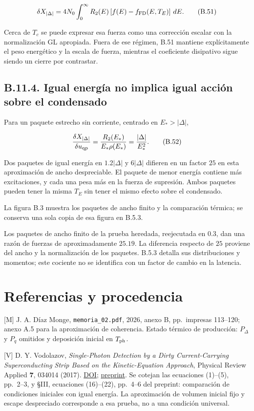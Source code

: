 \documentclass[
  spanish,
  10pt,
  a4paper,
]{article}
\begin{document}
\[
\delta X_{|\Delta|}
=4N_0\int_0^\infty R_2(E)
\left[f(E)-f_{\rm FD}(E,T_E)\right]\,dE.
\tag{B.51}
\]

Cerca de \(T_c\) se puede expresar esa fuerza como una corrección
escalar con la normalización GL apropiada. Fuera de ese régimen, B.51
mantiene explícitamente el peso energético y la escala de fuerza,
mientras el coeficiente disipativo sigue siendo un cierre por
contrastar.

\subsection{B.11.4. Igual energía no implica igual acción sobre el
condensado}\label{b.11.4.-igual-energuxeda-no-implica-igual-acciuxf3n-sobre-el-condensado}

Para un paquete estrecho sin corriente, centrado en \(E_*>|\Delta|\),

\[
\frac{\delta X_{|\Delta|}}{\delta u_{\rm qp}}
=\frac{R_2(E_*)}{E_*\rho(E_*)}
=\frac{|\Delta|}{E_*^2}.
\tag{B.52}
\]

Dos paquetes de igual energía en \(1.2|\Delta|\) y \(6|\Delta|\)
difieren en un factor \(25\) en esta aproximación de ancho despreciable.
El paquete de menor energía contiene más excitaciones, y cada una pesa
más en la fuerza de supresión. Ambos paquetes pueden tener la misma
\(T_E\) sin tener el mismo efecto sobre el condensado.

La figura B.3 muestra los paquetes de ancho finito y la comparación
térmica; se conserva una sola copia de esa figura en B.5.3.

Los paquetes de ancho finito de la prueba heredada, reejecutada en 0.3,
dan una razón de fuerzas de aproximadamente \(25.19\). La diferencia
respecto de \(25\) proviene del ancho y la normalización de los
paquetes. B.5.3 detalla sus distribuciones y momentos; este cociente no
se identifica con un factor de cambio en la latencia.

\section{Referencias y procedencia}\label{referencias-y-procedencia}

{[}M{]} J. A. Díaz Monge, \nolinkurl{memoria_02.pdf}, 2026, anexo B,
pp.~impresas 113--120; anexo A.5 para la aproximación de coherencia.
Estado térmico de producción: \(P_\Delta\) y \(P_q\) omitidos y
deposición inicial en \(T_{\rm ph}\).

{[}V{]} D. Y. Vodolazov, \emph{Single-Photon Detection by a Dirty
Current-Carrying Superconducting Strip Based on the Kinetic-Equation
Approach}, Physical Review Applied \textbf{7}, 034014 (2017).
\href{https://doi.org/10.1103/PhysRevApplied.7.034014}{DOI};
\href{https://arxiv.org/pdf/1611.06060}{preprint}. Se cotejan las
ecuaciones (1)--(5), pp.~2--3, y §III, ecuaciones (16)--(22), pp.~4--6
del preprint: comparación de condiciones iniciales con igual energía. La
aproximación de volumen inicial fijo y escape despreciado corresponde a
esa prueba, no a una condición universal.
\end{document}
